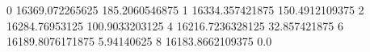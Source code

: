 0 16369.072265625 185.2060546875
1 16334.357421875 150.4912109375
2 16284.76953125 100.9033203125
4 16216.7236328125 32.857421875
6 16189.8076171875 5.94140625
8 16183.8662109375 0.0
